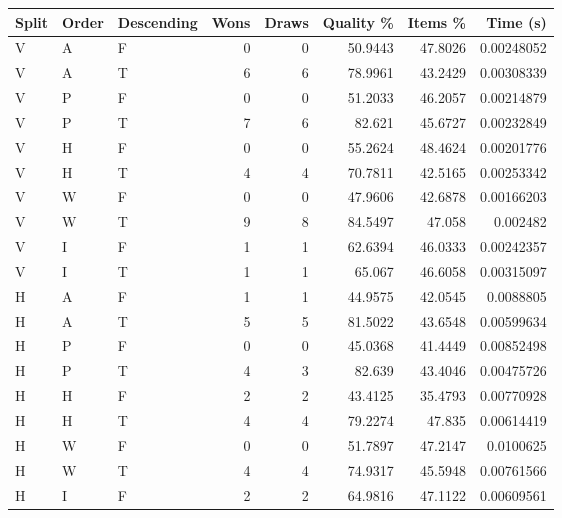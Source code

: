 \begin{tabular}{lllrrrrr}
    \hline
    Split & Order & Descending & Wons & Draws & Quality \% & Items \% & Time (s)   \\
    \hline
    V     & A     & F          & 0    & 0     & 50.9443    & 47.8026  & 0.00248052 \\
    V     & A     & T          & 6    & 6     & 78.9961    & 43.2429  & 0.00308339 \\
    V     & P     & F          & 0    & 0     & 51.2033    & 46.2057  & 0.00214879 \\
    V     & P     & T          & 7    & 6     & 82.621     & 45.6727  & 0.00232849 \\
    V     & H     & F          & 0    & 0     & 55.2624    & 48.4624  & 0.00201776 \\
    V     & H     & T          & 4    & 4     & 70.7811    & 42.5165  & 0.00253342 \\
    V     & W     & F          & 0    & 0     & 47.9606    & 42.6878  & 0.00166203 \\
    V     & W     & T          & 9    & 8     & 84.5497    & 47.058   & 0.002482   \\
    V     & I     & F          & 1    & 1     & 62.6394    & 46.0333  & 0.00242357 \\
    V     & I     & T          & 1    & 1     & 65.067     & 46.6058  & 0.00315097 \\
    H     & A     & F          & 1    & 1     & 44.9575    & 42.0545  & 0.0088805  \\
    H     & A     & T          & 5    & 5     & 81.5022    & 43.6548  & 0.00599634 \\
    H     & P     & F          & 0    & 0     & 45.0368    & 41.4449  & 0.00852498 \\
    H     & P     & T          & 4    & 3     & 82.639     & 43.4046  & 0.00475726 \\
    H     & H     & F          & 2    & 2     & 43.4125    & 35.4793  & 0.00770928 \\
    H     & H     & T          & 4    & 4     & 79.2274    & 47.835   & 0.00614419 \\
    H     & W     & F          & 0    & 0     & 51.7897    & 47.2147  & 0.0100625  \\
    H     & W     & T          & 4    & 4     & 74.9317    & 45.5948  & 0.00761566 \\
    H     & I     & F          & 2    & 2     & 64.9816    & 47.1122  & 0.00609561 \\

\end{tabular}
